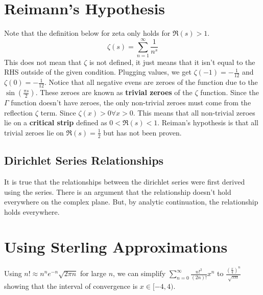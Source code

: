 \documentclass[../main.tex]{subfiles}
\begin{document}
\section{Reimann's Hypothesis}
Note that the definition below for zeta only holds for $\Re(s)>1$.
$$\zeta(s)=\sum_{n=1}^{\infty}\frac{1}{n^{s}}$$
This does not mean that $\zeta$ is not defined, it just means that it isn't equal to the RHS outside of the given condition.
Plugging values, we get $\zeta(-1)=-\frac{1}{12}$ and $\zeta(0)=-\frac{1}{12}$. Notice that all negative evens are zeroes of
the function due to the $\sin(\frac{\pi s}{2})$. These zeroes are known as \textbf{trivial zeroes} of the $\zeta$ function.
Since the $\Gamma$ function doesn't have zeroes, the only non-trivial zeroes must come from the reflection $\zeta$ term.
Since $\zeta(x)>0\forall x > 0$. This means that all non-trivial zeroes lie on a \textbf{critical strip} defined as $0<\Re(s)<1$.
Reiman's hypothesis is that all trivial zeroes lie on $\Re(s)=\frac{1}{2}$ but has not been proven. 

\subsection{Dirichlet Series Relationships}
It is true that the relationships between the dirichlet series were first derived using the series. There is an argument that the relationship
doesn't hold everywhere on the complex plane. But, by analytic continuation, the relationship holds everywhere.

\section{Using Sterling Approximations}
Using $n!\approx n^{n}e^{-n}\sqrt{2\pi n}$ for large $n$, we can simplify $\sum_{n=0}^{\infty}\frac{n!^{2}}{(2n)!}x^{n}$
to $\frac{(\frac{x}{4})^{n}}{\sqrt{\pi n}}$ showing that the interval of convergence is $x\in [-4,4)$.
\end{document}
